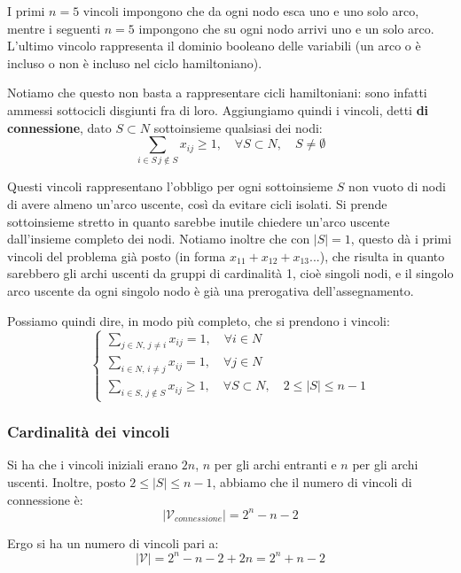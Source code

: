 \documentclass[a4paper,11pt]{article}
\begin{document}
I primi $n=5$ vincoli impongono che da ogni nodo esca uno e uno solo arco, mentre i seguenti $n=5$ impongono che su ogni nodo arrivi uno e un solo arco.
L'ultimo vincolo rappresenta il dominio booleano delle variabili (un arco o è incluso o non è incluso nel ciclo hamiltoniano).

Notiamo che questo non basta a rappresentare cicli hamiltoniani: sono infatti ammessi sottocicli disgiunti fra di loro. 
Aggiungiamo quindi i vincoli, detti \textbf{di connessione}, dato $S \subset N$ sottoinsieme qualsiasi dei nodi:
$$
\sum_{i \in S \, j \notin S} x_{ij} \geq 1, \quad \forall S \subset N, \quad S \neq \emptyset
$$

Questi vincoli rappresentano l'obbligo per ogni sottoinsieme $S$ non vuoto di nodi di avere almeno un'arco uscente, così da evitare cicli isolati.
Si prende sottoinsieme stretto in quanto sarebbe inutile chiedere un'arco uscente dall'insieme completo dei nodi.
Notiamo inoltre che con $|S| = 1$, questo dà i primi vincoli del problema già posto (in forma $x_{11} + x_{12} + x_{13} ...$), che risulta in quanto sarebbero gli archi uscenti da gruppi di cardinalità 1, cioè singoli nodi, e il singolo arco uscente da ogni singolo nodo è già una prerogativa dell'assegnamento.

\par\smallskip

Possiamo quindi dire, in modo più completo, che si prendono i vincoli:
\[
	\begin{cases}
		\sum\limits_{j \in N, \, j \neq i} x_{ij} = 1, \quad \forall i \in N \\		
		\sum\limits_{i \in N, \, i \neq j} x_{ij} = 1, \quad \forall j \in N \\		
		\sum\limits_{i \in S, \, j \notin S} x_{ij} \geq 1, \quad \forall S \subset N, \quad 2 \leq |S| \leq n - 1
	\end{cases}
\]

\subsubsection{Cardinalità dei vincoli}

Si ha che i vincoli iniziali erano $2n$, $n$ per gli archi entranti e $n$ per gli archi uscenti. 
Inoltre, posto $2 \leq |S| \leq n - 1$, abbiamo che il numero di vincoli di connessione è:
$$
|\mathcal{V}_{connessione}| = 2^n - n - 2
$$ 

Ergo si ha un numero di vincoli pari a:
$$
|\mathcal{V}| = 2^n - n - 2 + 2n = 2^n + n - 2
$$
\end{document}

